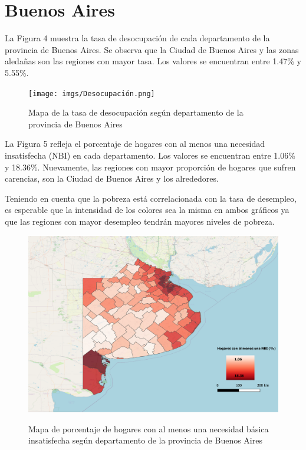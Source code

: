\documentclass[10.5pt]{article}   %
\begin{document}
\section*{Buenos Aires}
La Figura 4 muestra la tasa de desocupación de cada departamento de la provincia de Buenos Aires. Se observa que la Ciudad de Buenos Aires y las zonas aledañas son las regiones con mayor tasa. Los valores se encuentran entre 1.47\% y 5.55\%.
\begin{figure}[H]
\centering
    \centering
    \texttt{[image: imgs/Desocupación.png]}
    \label{fig2}
\caption{Mapa de la tasa de desocupación según departamento de la provincia de Buenos Aires}
\end{figure}


La Figura 5 refleja el porcentaje de hogares con al menos una necesidad insatisfecha (NBI) en cada departamento. Los valores se encuentran entre 1.06\% y 18.36\%. Nuevamente, las regiones con mayor proporción de hogares que sufren carencias, son la Ciudad de Buenos Aires y los alrededores.

Teniendo en cuenta que la pobreza está correlacionada con la tasa de desempleo, es esperable que la intensidad de los colores sea la misma en ambos gráficos ya que las regiones con mayor desempleo tendrán mayores niveles de pobreza. 

\begin{figure}[H]
\centering
    \centering
    \includegraphics[scale=0.45]{imgs/NBI.png}
    \label{fig2}
\caption{Mapa de porcentaje de hogares con al menos una necesidad básica insatisfecha según departamento de la provincia de Buenos Aires}
\end{figure}
\end{document}
